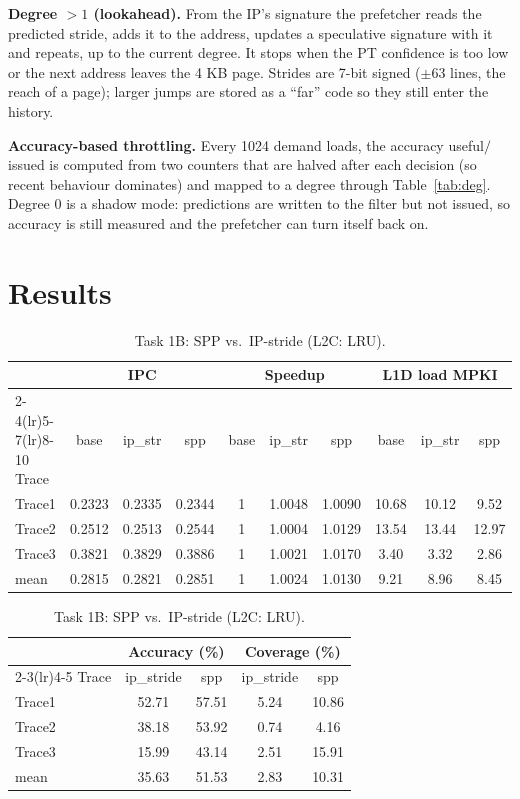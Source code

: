 \documentclass[12pt]{report}
\begin{document}
\textbf{Degree $>1$ (lookahead).} From the IP's signature the prefetcher
reads the predicted stride, adds it to the address, updates a speculative
signature with it and repeats, up to the current degree. It stops when the
PT confidence is too low or the next address leaves the 4 KB page. Strides are
7-bit signed ($\pm63$ lines, the reach of a page); larger jumps are stored as
a ``far'' code so they still enter the history.

\textbf{Accuracy-based throttling.} Every 1024 demand loads, the accuracy
useful$/$issued is computed from two counters that are halved after each
decision (so recent behaviour dominates) and mapped to a degree through
Table~\ref{tab:deg}. Degree 0 is a shadow mode: predictions are written to the
filter but not issued, so accuracy is still measured and the prefetcher can
turn itself back on.

\section{Results}

\begin{table}[H]\centering\small
\begin{tabular}{l ccc ccc ccc}
\toprule
& \multicolumn{3}{c}{IPC} & \multicolumn{3}{c}{Speedup} & \multicolumn{3}{c}{L1D load MPKI}\\
\cmidrule(lr){2-4}\cmidrule(lr){5-7}\cmidrule(lr){8-10}
Trace & base & ip\_str & spp & base & ip\_str & spp & base & ip\_str & spp \\
\midrule
Trace1 & 0.2323 & 0.2335 & 0.2344 & 1 & 1.0048 & 1.0090 & 10.68 & 10.12 & 9.52 \\
Trace2 & 0.2512 & 0.2513 & 0.2544 & 1 & 1.0004 & 1.0129 & 13.54 & 13.44 & 12.97 \\
Trace3 & 0.3821 & 0.3829 & 0.3886 & 1 & 1.0021 & 1.0170 & 3.40 & 3.32 & 2.86 \\
mean   & 0.2815 & 0.2821 & 0.2851 & 1 & 1.0024 & 1.0130 & 9.21 & 8.96 & 8.45 \\
\bottomrule
\end{tabular}

\vspace{0.6em}
\begin{tabular}{l cc cc}
\toprule
& \multicolumn{2}{c}{Accuracy (\%)} & \multicolumn{2}{c}{Coverage (\%)}\\
\cmidrule(lr){2-3}\cmidrule(lr){4-5}
Trace & ip\_stride & spp & ip\_stride & spp \\
\midrule
Trace1 & 52.71 & 57.51 & 5.24 & 10.86 \\
Trace2 & 38.18 & 53.92 & 0.74 & 4.16 \\
Trace3 & 15.99 & 43.14 & 2.51 & 15.91 \\
mean   & 35.63 & 51.53 & 2.83 & 10.31 \\
\bottomrule
\end{tabular}
\caption{Task 1B: SPP vs.\ IP-stride (L2C: LRU).}
\label{tab:t1}
\end{table}
\end{document}

